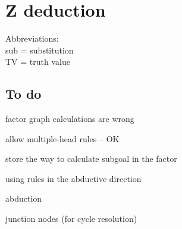\chapter{Z deduction}

\begin{comment}[language=Lisp]
;;;; =======================================================================
;;;;    Deduction: backward-chaining, using pure Z logic, best-first search
;;;; =======================================================================

;;;; Genifer/deduction.lisp
;;;;
;;;; Copyright (C) 2009 Genint
;;;; All Rights Reserved
;;;;
;;;; Written by YKY
;;;;
;;;; This program is free software; you can redistribute it and/or modify
;;;; it under the terms of the GNU Affero General Public License v3 as
;;;; published by the Free Software Foundation and including the exceptions
;;;; at http://opencog.org/wiki/Licenses
;;;;
;;;; This program is distributed in the hope that it will be useful,
;;;; but WITHOUT ANY WARRANTY; without even the implied warranty of
;;;; MERCHANTABILITY or FITNESS FOR A PARTICULAR PURPOSE.  See the
;;;; GNU General Public License for more details.
;;;;
;;;; You should have received a copy of the GNU Affero General Public License
;;;; along with this program; if not, write to:
;;;; Free Software Foundation, Inc.,
;;;; 51 Franklin Street, Fifth Floor, Boston, MA 02110-1301 USA.
;;;; ------------------------------------------------------------------------------
\end{comment}

Abbreviations:\\
\tab sub = substitution\\
\tab TV = truth value

\section{To do}
\begin{compactenum}
\item factor graph calculations are wrong
  \begin{compactenum}
  \item allow multiple-head rules -- OK
  \item store the way to calculate subgoal in the factor
  \end{compactenum}
\item using rules in the abductive direction
\item abduction
\item junction nodes (for cycle resolution)
\end{compactenum}

